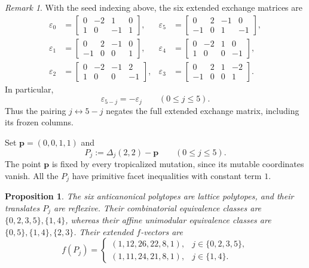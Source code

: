\documentclass[10pt]{amsart}
\numberwithin{equation}{section}
\theoremstyle{plain}
\newtheorem{proposition}[theorem]{Proposition}
\theoremstyle{definition}
\theoremstyle{remark}
\newtheorem{remark}[theorem]{Remark}
\begin{document}
\begin{remark}\label{rmk_B2}
With the seed indexing above, the six extended exchange matrices are
\[
\begin{aligned}
	\varepsilon_0&=
	\begin{bmatrix}0&-2&1&0\\1&0&-1&1\end{bmatrix},
	&
	\varepsilon_5&=
	\begin{bmatrix}0&2&-1&0\\-1&0&1&-1\end{bmatrix},
	\\[4pt]
	\varepsilon_1&=
	\begin{bmatrix}0&2&-1&0\\-1&0&0&1\end{bmatrix},
	&
	\varepsilon_4&=
	\begin{bmatrix}0&-2&1&0\\1&0&0&-1\end{bmatrix},
	\\[4pt]
	\varepsilon_2&=
	\begin{bmatrix}0&-2&-1&2\\1&0&0&-1\end{bmatrix},
	&
	\varepsilon_3&=
	\begin{bmatrix}0&2&1&-2\\-1&0&0&1\end{bmatrix}.
\end{aligned}
\]
In particular,
\[
\varepsilon_{5-j}=-\varepsilon_j
\qquad(0\leq j\leq5).
\]
Thus the pairing \(j\leftrightarrow5-j\) negates the full extended
exchange matrix, including its frozen columns.
\end{remark}

Set $\mathbf p=(0,0,1,1)$ and
\[
P_j:=\Delta_j(2,2)-\mathbf p\qquad(0\leq j\leq5).
\]
The point $\mathbf p$ is fixed by every tropicalized mutation,
since its mutable coordinates vanish. All the $P_j$ have
primitive facet inequalities with constant term $1$.

\begin{proposition}\label{prop_B2_classification}
	The six anticanonical polytopes are lattice polytopes, and
	their translates $P_j$ are reflexive.
	Their combinatorial equivalence classes are $	\{0,2,3,5\}, \{1,4\}$,
	whereas their affine unimodular equivalence classes are
	$\{0,5\}, \{1,4\}, \{2,3\}$.
	Their extended $f$-vectors are
	\[
	f(P_j)=
	\begin{cases}
		(1,12,26,22,8,1),&j\in\{0,2,3,5\},\\
		(1,11,24,21,8,1),&j\in\{1,4\}.
	\end{cases}
	\]
\end{proposition}
\end{document}
